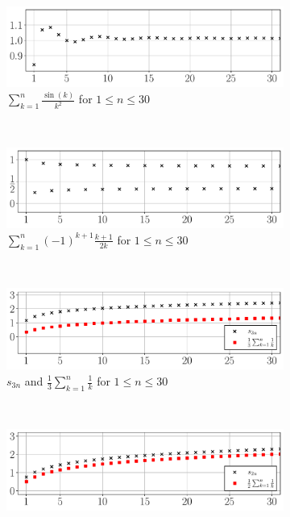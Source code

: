 \documentclass{lew98_solutions}
\begin{document}
\begin{solution}
    \begin{figure}[H]\ContinuedFloat
        \centering
        \begin{subfigure}{0.85\textwidth}
            \includegraphics[width=\textwidth]{UA_Figures/UA_ex2_7_2_fig_b.pdf}
            \caption{\( \sum_{k=1}^n \frac{\sin(k)}{k^2} \) for \( 1 \leq n \leq 30 \)}
        \end{subfigure} \\
        \begin{subfigure}{0.85\textwidth}
            \includegraphics[width=\textwidth]{UA_Figures/UA_ex2_7_2_fig_c.pdf}
            \caption{\( \sum_{k=1}^n (-1)^{k+1} \frac{k + 1}{2k} \) for \( 1 \leq n \leq 30 \)}
        \end{subfigure} \\
        \begin{subfigure}{0.85\textwidth}
            \includegraphics[width=\textwidth]{UA_Figures/UA_ex2_7_2_fig_d.pdf}
            \caption{\( s_{3n} \) and \( \tfrac{1}{3} \sum_{k=1}^n \frac{1}{k} \) for \( 1 \leq n \leq 30 \)}
        \end{subfigure} \\
        \begin{subfigure}{0.85\textwidth}
            \includegraphics[width=\textwidth]{UA_Figures/UA_ex2_7_2_fig_e.pdf}

\end{subfigure}
\end{figure}
\end{solution}
\end{document}

